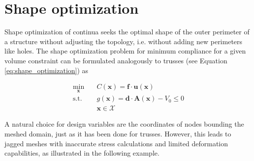     

\section{Shape optimization}
Shape optimization of continua seeks the optimal shape of the outer perimeter of a structure without adjusting the topology, i.e. without adding new perimeters like holes. The shape optimization problem for minimum compliance for a given volume constraint can be formulated analogously to trusses (see Equation \eqref{eq:shape_optimization}) as 

\begin{equation}
    \begin{aligned}
        \min_{\mathbf{x}} \quad & C(\mathbf{x}) = \mathbf{f} \cdot \mathbf{u}(\mathbf{x})\\
        \textrm{s.t.} \quad & g(\mathbf{x}) = \mathbf{d} \cdot \mathbf{A}(\mathbf{x}) - V_0 \le 0  \\
                            & \mathbf{x} \in \mathcal{X}
    \end{aligned}
    \label{eq:shape_optimization_continuum}
\end{equation}

A natural choice for design variables are the coordinates of nodes bounding the meshed domain, just as it has been done for trusses. However, this leads to jagged meshes with inaccurate stress calculations and limited deformation capabilities, as illustrated in the following example.

